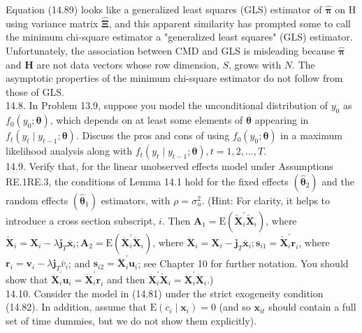 \documentclass[10pt]{article}
\begin{document}
Equation (14.89) looks like a generalized least squares (GLS) estimator of $\hat{\boldsymbol{\pi}}$ on H using variance matrix $\hat{\boldsymbol{\Xi}}$, and this apparent similarity has prompted some to call the minimum chi-square estimator a "generalized least squares" (GLS) estimator. Unfortunately, the association between CMD and GLS is misleading because $\hat{\boldsymbol{\pi}}$ and $\mathbf{H}$ are not data vectors whose row dimension, $S$, grows with $N$. The asymptotic properties of the minimum chi-square estimator do not follow from those of GLS.\\
14.8. In Problem 13.9, suppose you model the unconditional distribution of $y_{0}$ as $f_{0}\left(y_{0} ; \boldsymbol{\theta}\right)$, which depends on at least some elements of $\boldsymbol{\theta}$ appearing in $f_{t}\left(y_{t} \mid y_{t-1} ; \boldsymbol{\theta}\right)$. Discuss the pros and cons of using $f_{0}\left(y_{0} ; \boldsymbol{\theta}\right)$ in a maximum likelihood analysis along with $f_{t}\left(y_{t} \mid y_{t-1} ; \boldsymbol{\theta}\right), t=1,2, \ldots, T$.\\
14.9. Verify that, for the linear unobserved effects model under Assumptions RE.1RE.3, the conditions of Lemma 14.1 hold for the fixed effects $\left(\hat{\boldsymbol{\theta}}_{2}\right)$ and the random effects $\left(\hat{\boldsymbol{\theta}}_{1}\right)$ estimators, with $\rho=\sigma_{u}^{2}$. (Hint: For clarity, it helps to introduce a cross section subscript, $i$. Then $\mathbf{A}_{1}=\mathrm{E}\left(\check{\mathbf{X}}_{i}^{\prime} \check{\mathbf{X}}_{i}\right)$, where $\check{\mathbf{X}}_{i}=\mathbf{X}_{i}-\lambda \mathbf{j}_{T} \overline{\mathbf{x}}_{i} ; \mathbf{A}_{2}=\mathrm{E}\left(\ddot{\mathbf{X}}_{i}^{\prime} \ddot{\mathbf{X}}_{i}\right)$, where $\ddot{\mathbf{X}}_{i}=\mathbf{X}_{i}-\mathbf{j}_{T} \overline{\mathbf{x}}_{i} ; \mathbf{s}_{i 1}=\check{\mathbf{X}}_{i}^{\prime} \mathbf{r}_{i}$, where $\mathbf{r}_{i}=\mathbf{v}_{i}-\lambda \mathbf{j}_{T} \bar{v}_{i}$; and $\mathbf{s}_{i 2}=\ddot{\mathbf{X}}_{i}^{\prime} \mathbf{u}_{i}$; see Chapter 10 for further notation. You should show that $\ddot{\mathbf{X}}_{i}^{\prime} \mathbf{u}_{i}=\ddot{\mathbf{X}}_{i}^{\prime} \mathbf{r}_{i}$ and then $\ddot{\mathbf{X}}_{i}^{\prime} \check{\mathbf{X}}_{i}=\ddot{\mathbf{X}}_{i}^{\prime} \ddot{\mathbf{X}}_{i}$.)\\
14.10. Consider the model in (14.81) under the strict exogeneity condition (14.82). In addition, assume that $\mathrm{E}\left(c_{i} \mid \mathbf{x}_{i}\right)=0$ (and so $\mathbf{x}_{i t}$ should contain a full set of time dummies, but we do not show them explicitly).\\
\end{document}
